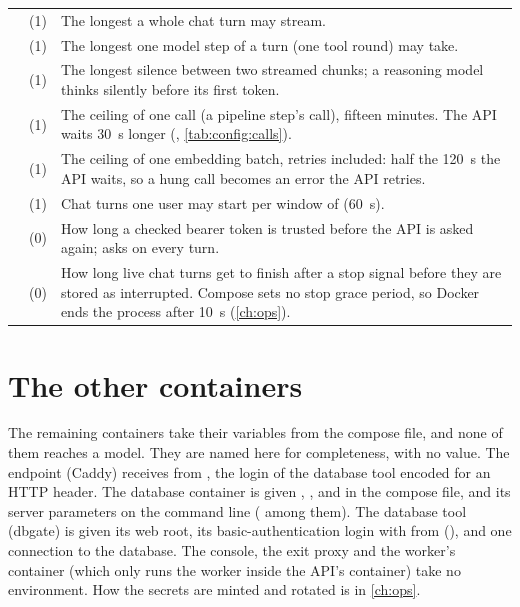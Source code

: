 \begin{xltabular}{\textwidth}{@{}L{38mm}L{40mm}Y@{}}
 &  (1) & The longest a whole chat turn may stream. \\
 &  (1) & The longest one model step of a turn (one tool round) may take. \\
 &  (1) & The longest silence between two streamed chunks; a reasoning model thinks silently before its first token. \\
 &  (1) & The ceiling of one  call (a pipeline step's call), fifteen minutes. The API waits 30~s longer (, \cref{tab:config:calls}). \\
 &  (1) & The ceiling of one embedding batch, retries included: half the 120~s the API waits, so a hung call becomes an error the API retries. \\
 &  (1) & Chat turns one user may start per window of  (60~s). \\
 &  (0) & How long a checked bearer token is trusted before the API is asked again;  asks on every turn. \\
 &  (0) & How long live chat turns get to finish after a stop signal before they are stored as interrupted. Compose sets no stop grace period, so Docker ends the process after 10~s (\cref{ch:ops}). \\
\end{xltabular}


\section{The other containers}\label{sec:config:other}

The remaining containers take their variables from the compose file, and none of them reaches
a model. They are named here for completeness, with no value. The endpoint (Caddy) receives
 from , the login of the database tool encoded for an HTTP
header. The database container is given , ,
 and  in the compose file, and its server parameters on
the command line ( among them). The database tool (dbgate) is given
its web root, its basic-authentication login with  from 
(), and one connection to the database. The console, the exit proxy and the worker's container (which only
runs the worker inside the API's container) take no environment. How the secrets are minted and rotated is in \cref{ch:ops}.

